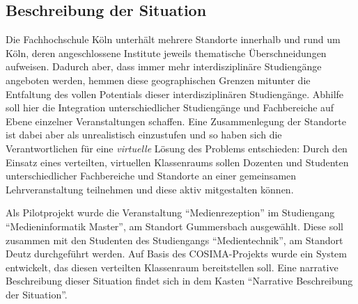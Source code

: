 
\subsection{Beschreibung der Situation} %
\label{sub:beschreibung_des_szenario}

  Die Fachhochschule Köln unterhält mehrere Standorte innerhalb und rund um Köln, deren angeschlossene Institute jeweils thematische Überschneidungen aufweisen. Dadurch aber, dass immer mehr interdisziplinäre Studiengänge angeboten werden, hemmen diese geographischen Grenzen mitunter die Entfaltung des vollen Potentials dieser interdisziplinären Studiengänge. Abhilfe soll hier die Integration unterschiedlicher Studiengänge und Fachbereiche auf Ebene einzelner Veranstaltungen schaffen. Eine Zusammenlegung der Standorte ist dabei aber als unrealistisch einzustufen und so haben sich die Verantwortlichen für eine \emph{virtuelle} Lösung des Problems entschieden: Durch den Einsatz eines verteilten, virtuellen Klassenraums sollen Dozenten und Studenten unterschiedlicher Fachbereiche und Standorte an einer gemeinsamen Lehrveranstaltung teilnehmen und diese aktiv mitgestalten können.

  Als Pilotprojekt wurde die Veranstaltung "`Medienrezeption"' im Studiengang "`Medieninformatik Master"', am Standort Gummersbach ausgewählt. Diese soll zusammen mit den Studenten des Studiengangs "`Medientechnik"', am Standort Deutz durchgeführt werden. Auf Basis des COSIMA-Projekts wurde ein System entwickelt, das diesen verteilten Klassenraum bereitstellen soll. Eine narrative Beschreibung dieser Situation findet sich in dem Kasten "`Narrative Beschreibung der Situation"'.
  
